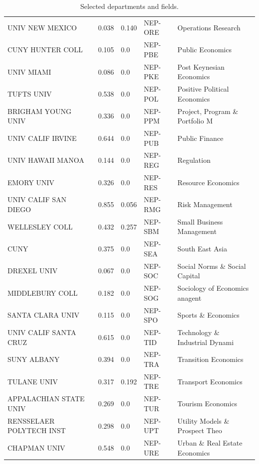 \begin{table}
\begin{tabular}{lllll}
        UNIV NEW MEXICO          & 0.038 & 0.140       & NEP-ORE   & Operations Research\\
        CUNY HUNTER COLL         & 0.105 & 0.0         & NEP-PBE   & Public Economics\\
        UNIV MIAMI               & 0.086 & 0.0         & NEP-PKE   & Post Keynesian Economics\\
        TUFTS UNIV               & 0.538 & 0.0         & NEP-POL   & Positive Political Economics\\
        BRIGHAM YOUNG UNIV       & 0.336 & 0.0         & NEP-PPM   & Project, Program \& Portfolio M\\
        UNIV CALIF IRVINE        & 0.644 & 0.0         & NEP-PUB   & Public Finance\\
        UNIV HAWAII MANOA        & 0.144 & 0.0         & NEP-REG   & Regulation\\
        EMORY UNIV               & 0.326 & 0.0         & NEP-RES   & Resource Economics\\
        UNIV CALIF SAN DIEGO     & 0.855 & 0.056       & NEP-RMG   & Risk Management\\
        WELLESLEY COLL           & 0.432 & 0.257       & NEP-SBM   & Small Business Management\\
        CUNY                     & 0.375 & 0.0         & NEP-SEA   & South East Asia\\
        DREXEL UNIV              & 0.067 & 0.0         & NEP-SOC   & Social Norms \& Social Capital\\
        MIDDLEBURY COLL          & 0.182 & 0.0         & NEP-SOG   & Sociology of Economics anagent\\
        SANTA CLARA UNIV         & 0.115 & 0.0         & NEP-SPO   & Sports \& Economics\\
        UNIV CALIF SANTA CRUZ    & 0.615 & 0.0         & NEP-TID   & Technology \& Industrial Dynami\\
        SUNY ALBANY              & 0.394 & 0.0         & NEP-TRA   & Transition Economics\\
        TULANE UNIV              & 0.317 & 0.192       & NEP-TRE   & Transport Economics\\
        APPALACHIAN STATE UNIV   & 0.269 & 0.0         & NEP-TUR   & Tourism Economics\\
        RENSSELAER POLYTECH INST & 0.298 & 0.0         & NEP-UPT   & Utility Models \& Prospect Theo\\
        CHAPMAN UNIV             & 0.548 & 0.0         & NEP-URE   & Urban \& Real Estate Economics \\ \hline
    \end{tabular}
    \caption{Selected departments and fields.}
    \label{tab:dep_field}
\end{table}

